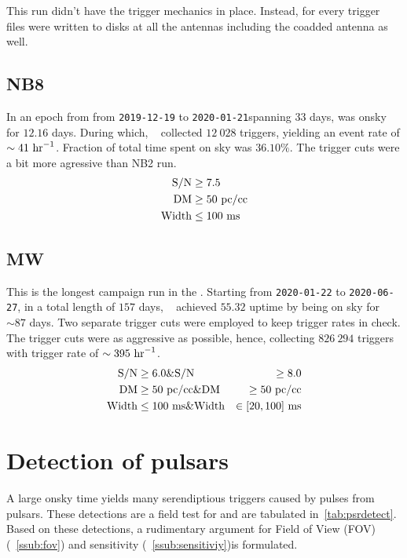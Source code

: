 \par This run didn't have the \dbson trigger mechanics in place. Instead, for every trigger \fbson~ files were written to disks at all the antennas including the coadded antenna as well.

\subsection {NB8}

\par In an epoch from from \texttt{2019-12-19} to \texttt{2020-01-21}spanning $33$ days, \vf was onsky for $12.16$ days.
During which, \vf~ collected $12\ 028$ triggers, yielding an event rate of $\sim 41\ {\rm hr}^{-1}$.
Fraction of total time spent on sky was $36.10\%$. 
The trigger cuts were a bit more agressive than NB2 run.
\begin{align*}
	{\rm S/N} &\geq 7.5 \\
	{\rm DM} &\geq 50 {\rm\ pc/cc} \\
	{\rm Width} &\leq 100 {\rm\ ms}
\end{align*}


\subsection {MW}

\par This is the longest campaign run in the \vfpfs. 
Starting from \texttt{2020-01-22} to \texttt{2020-06-27}, in a total length of $157$ days, \vf~ achieved $55.32$ uptime by being on sky for $\sim 87$ days.
Two separate trigger cuts were employed to keep trigger rates in check.
The trigger cuts were as aggressive as possible, hence, collecting $826\ 294$ triggers with trigger rate of $\sim 395\ {\rm hr}^{-1}$.
\begin{align*}
	{\rm S/N} &\geq 6.0 \&  {\rm S/N} &\geq 8.0 \\
	{\rm DM} &\geq 50 {\rm\ pc/cc}  \& {\rm DM} &\geq 50 {\rm\ pc/cc}\\
	{\rm Width} &\leq 100 {\rm\ ms} \& {\rm Width} &\in [20, 100] {\rm\ ms}
\end{align*}

\section {Detection of pulsars}

\par A large onsky time yields many serendiptious triggers caused by pulses from pulsars. 
These detections are a field test for \vf and are tabulated in~\autoref{tab:psrdetect}.
Based on these detections, a rudimentary argument for Field of View (FOV) (~\autoref{ssub:fov}) and sensitivity (~\autoref{ssub:sensitiviy})is formulated.

